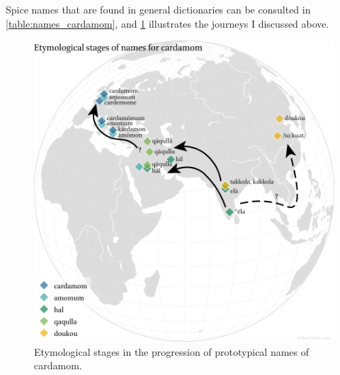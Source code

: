 Spice names that are found in general dictionaries can be consulted in \cref{table:names_cardamom}, and \cref{fig:diffusion_cardamom} illustrates the journeys I discussed above.



\begin{figure}[ht]
    \centering
    \includegraphics[width=\textwidth]{imgs/plots/diffusion_cardamom_edited.pdf}
    \caption{Etymological stages in the progression of prototypical names of cardamom.}
    \label{fig:diffusion_cardamom}
\end{figure}








